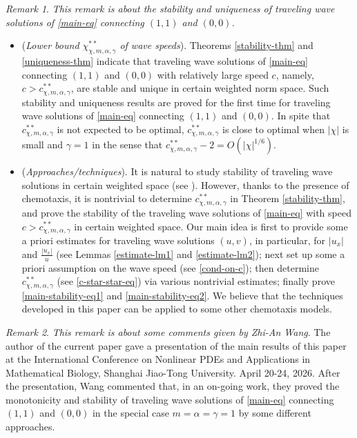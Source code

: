 \documentclass[11pt]{article} %
\theoremstyle{remark}
\newtheorem{remark}{Remark}[section]
\theoremstyle{remark}
\numberwithin{equation}{section}
\numberwithin{figure}{section}
\numberwithin{table}{section}
\begin{document}
\begin{remark}
\label{rk4}
{\it This remark is about the stability and uniqueness of traveling wave solutions of \eqref{main-eq} connecting $(1,1)$ and $(0,0)$.}
\begin{itemize}

\item[(1)] ({\it Lower bound $\chi^{**}_{\chi,m,\alpha,\gamma}$ of wave speeds}). Theorems \ref{stability-thm} and \ref{uniqueness-thm} indicate that traveling wave solutions of \eqref{main-eq} connecting $(1,1)$ and $(0,0)$ with relatively large speed $c$, namely, $c>c^{**}_{\chi,m,\alpha,\gamma}$, are stable and unique in certain weighted norm space.
Such stability and uniqueness  results are proved for the first time for traveling wave solutions of \eqref{main-eq} connecting $(1,1)$ and $(0,0)$. 
In spite that $c^{**}_{\chi,m, \alpha,\gamma}$ is not expected to be optimal,  $c^{**}_{\chi,m,\alpha,\gamma}$ is close to optimal when $|\chi|$ is small  and $\gamma=1$ in the sense
that $c^{**}_{\chi,m,\alpha,\gamma}-2=O(|\chi|^{1/6})$.




\item[(2)] ({\it Approaches/techniques}).  It is natural to study stability of traveling wave solutions in certain weighted space (see \cite{Sat1, Sat2}).  However,  thanks to the presence of chemotaxis, it is nontrivial to determine $c^{**}_{\chi,m,\alpha,\gamma}$ in Theorem \ref{stability-thm},  and  prove the stability of the traveling wave solutions of \eqref{main-eq} with speed $c>c^{**}_{\chi,m,\alpha,\gamma}$ in certain  weighted space. Our main idea is first to provide some a priori estimates for traveling wave solutions
$(u,v)$, in particular, for $|u_x|$ and $\frac{|u_x|}{u}$ (see  Lemmas \ref{estimate-lm1} and \ref{estimate-lm2});  next  set up some a priori assumption on the wave speed (see \eqref{cond-on-c});  then determine $c^{**}_{\chi,m,\alpha,\gamma}$ (see \eqref{c-star-star-eq}) via various nontrivial estimates; finally prove \eqref{main-stability-eq1} and \eqref{main-stability-eq2}. We believe that the techniques developed in this paper can be applied to some other chemotaxis models.
\end{itemize}

\end{remark}


\begin{remark}
\label{rk5}
{\it This remark is about some comments given by Zhi-An Wang}.  The author of the current paper gave a presentation of the main results of this paper  at  the International Conference on Nonlinear PDEs and
Applications in Mathematical Biology, Shanghai Jiao-Tong University. 
April 20-24, 2026. After the presentation, Wang commented that, in an on-going work, they proved  the monotonicity and stability of traveling wave solutions of  \eqref{main-eq} connecting $(1,1)$ and $(0,0)$ in the special case $m=\alpha=\gamma=1$ by some different approaches.
\end{remark}
\end{document}
